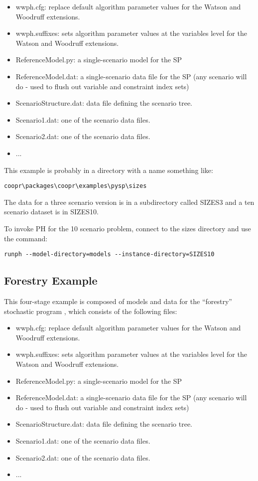 \begin{itemize}
\item wwph.cfg: replace default algorithm parameter values for the Watson and Woodruff extensions.
\item wwph.suffixes: sets algorithm parameter values at the variables level for the Watson and Woodruff extensions.
\item ReferenceModel.py: a single-scenario model for the SP
\item ReferenceModel.dat: a single-scenario data file for the SP (any scenario will do - used to flush out variable and constraint index sets)
\item ScenarioStructure.dat: data file defining the scenario tree.
\item Scenario1.dat: one of the scenario data files.
\item Scenario2.dat: one of the scenario data files.
\item ...
\end{itemize}

This example is probably in a directory with a name something like:

\begin{verbatim}
coopr\packages\coopr\examples\pysp\sizes
\end{verbatim}

The data for a three scenario version is in a subdirectory called SIZES3 and a ten scenario
dataset is in SIZES10.

To invoke PH for the 10 scenario problem, connect to the sizes directory and use the command:

\begin{verbatim}
runph --model-directory=models --instance-directory=SIZES10
\end{verbatim}


\subsection{Forestry Example}

This four-stage example is composed of models and data for the ``forestry'' stochastic program \cite{}, which consists of the following files:

\begin{itemize}
\item wwph.cfg: replace default algorithm parameter values for the Watson and Woodruff extensions.
\item wwph.suffixes: sets algorithm parameter values at the variables level for the Watson and Woodruff extensions.
\item ReferenceModel.py: a single-scenario model for the SP
\item ReferenceModel.dat: a single-scenario data file for the SP (any scenario will do - used to flush out variable and constraint index sets)
\item ScenarioStructure.dat: data file defining the scenario tree.
\item Scenario1.dat: one of the scenario data files.
\item Scenario2.dat: one of the scenario data files.
\item ...
\end{itemize}

